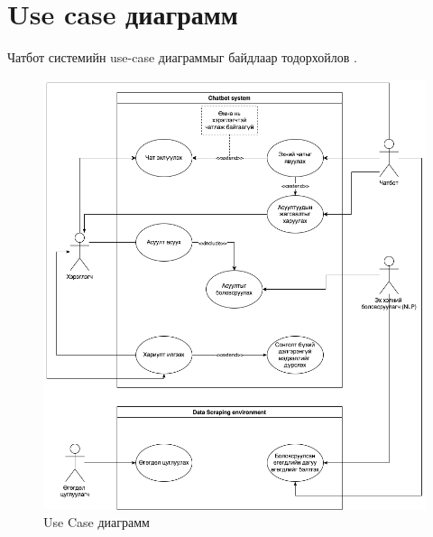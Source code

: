 \section{Use case диаграмм}
Чатбот системийн use-case диаграммыг байдлаар тодорхойлов \cite{useCase}.
\begin{figure}[ht]
  \centering
  \includegraphics[width=\textwidth-2.2cm]{images/useCase.png}
  \caption{Use Case диаграмм}\label{fig:useCase}
\end{figure}
